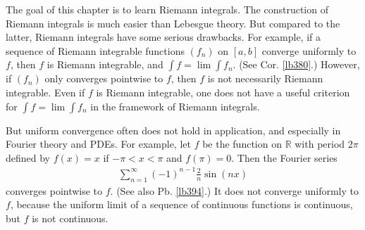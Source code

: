 \documentclass[12pt,b5paper,notitlepage]{article}
\theoremstyle{definition}
\theoremstyle{plain}
\newcommand{\Rbb}{\mathbb R}
\newcommand{\eps}{\varepsilon}
\numberwithin{equation}{section}
\begin{document}





The goal of this chapter is to learn Riemann integrals. The construction of Riemann integrals is much easier than Lebesgue theory. But compared to the latter, Riemann integrals have some serious drawbacks. For example, if a sequence of Riemann integrable functions $(f_n)$ on $[a,b]$ converge uniformly to $f$, then $f$ is Riemann integrable, and $\int f=\lim \int f_n$. (See Cor. \ref{lb380}.) However, if $(f_n)$ only converges pointwise to $f$, then $f$ is not necessarily Riemann integrable. Even if $f$ is Riemann integrable, one does not have a useful criterion for $\int f=\lim \int f_n$ in the framework of Riemann integrals. 

But uniform convergence often does not hold in application, and especially in Fourier theory and PDEs. For example, let $f$ be the function on $\Rbb$ with period $2\pi$ defined by $f(x)=x$ if $-\pi<x<\pi$ and $f(\pi)=0$. Then the Fourier series
\begin{align}
\sum_{n=1}^\infty (-1)^{n-1}\frac 2n\sin(nx)
\end{align}
converges pointwise to $f$. (See also Pb. \ref{lb394}.) It does not converge uniformly to $f$, because the uniform limit of a sequence of continuous functions is continuous, but $f$ is not continuous.
\end{document}
